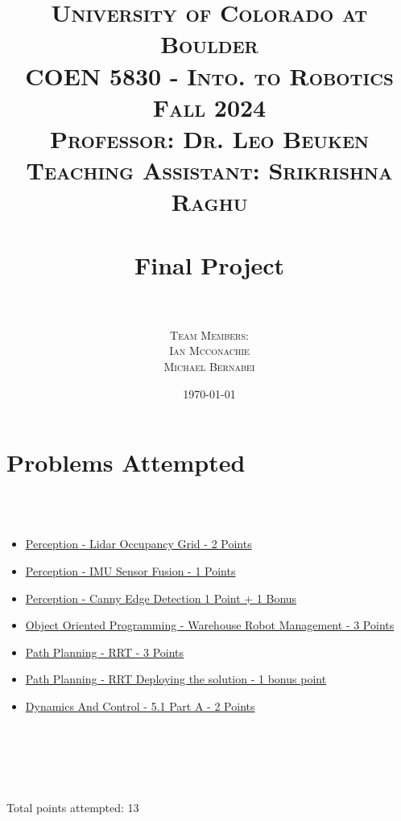 \documentclass{article}
\title{
\normalfont \LARGE
\textsc{University of Colorado at Boulder} \\ [25pt] %
\textsc{COEN 5830 - Into. to Robotics} \\ [20pt]
\textsc{Fall 2024} \\ [20pt]
\textsc{Professor: Dr. Leo Beuken} \\ [12pt]
\textsc{Teaching Assistant: Srikrishna Raghu} \\ [12pt]
\horrule{1pt} \\[0.4cm] %
\huge Final Project \\ %
\horrule{1pt} \\[0.6cm] %
}
\author{
  \textsc{ Team Members:} \\ [4 mm]
  \textsc{ Ian Mcconachie}\\[2mm]
  \textsc{ Michael Bernabei}\\[2mm]
}
\date{\normalsize\today} %
\numberwithin{equation}{section} %
\numberwithin{figure}{section} %
\numberwithin{table}{section} %
\begin{document}
\maketitle %
\thispagestyle{empty} %
\newpage




\tableofcontents
\listofalgorithms

\newpage

%

\section{Problems Attempted}
\\~\\
\begin{center}
 \begin{minipage}{.55\textwidth}
 \begin{itemize}
    \item \hyperref[sec:Perception]{Perception - Lidar Occupancy Grid - 2 Points}
    \item \hyperref[sec:SensorFusion]{Perception - IMU Sensor Fusion - 1 Points}
    \item \hyperref[sec:CannyEdge]{Perception - Canny Edge Detection 1 Point + 1 Bonus}
    \item \hyperref[sec:OOO]{Object Oriented Programming - Warehouse Robot Management - 3 Points}
    \item \hyperref[sec:RRT]{Path Planning - RRT - 3 Points }
    \item \hyperref[sec:RRT_bonus]{Path Planning - RRT Deploying the solution - 1 bonus point}
    \item \hyperref[sec:DynAndCtrl]{Dynamics And Control - 5.1 Part A - 2 Points}
 \end{itemize}
 \end{minipage}
\end{center}
\\~\\
\\~\\
\begin{center}
{\huge Total points attempted: 13 }
\end{center}

\newpage
\end{document}
